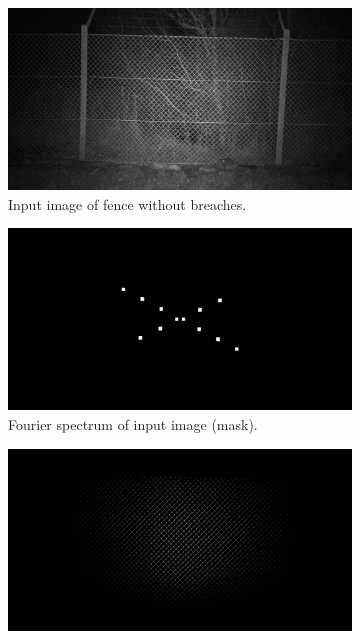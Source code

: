 \documentclass[../Head/Main.tex]{subfiles}
\begin{document}
\begin{figure}[H]
    \centering
    \begin{subfigure}{.48\textwidth}
        \centering
        \includegraphics[width=\textwidth]{../Figures/fourier_transformation/fence_clean.png}
        \caption{Input image of fence without breaches.}
        \label{fig:image_without_breach}
    \end{subfigure}
    \hfill
    \begin{subfigure}{.48\textwidth}
        \centering
        \includegraphics[width=\textwidth]{../Figures/fourier_transformation/fence_mask.png}
        \caption{Fourier spectrum of input image (mask).}
        \label{fig:fourier_mask_without_breach}
    \end{subfigure}
    \label{fig:input_and_fouier}
            \begin{subfigure}{.48\textwidth}
        \centering
        \includegraphics[width=\textwidth]{../Figures/fourier_transformation/fence_clean_20_low_pass_filtered.png}

\end{subfigure}
\end{figure}
\end{document}
